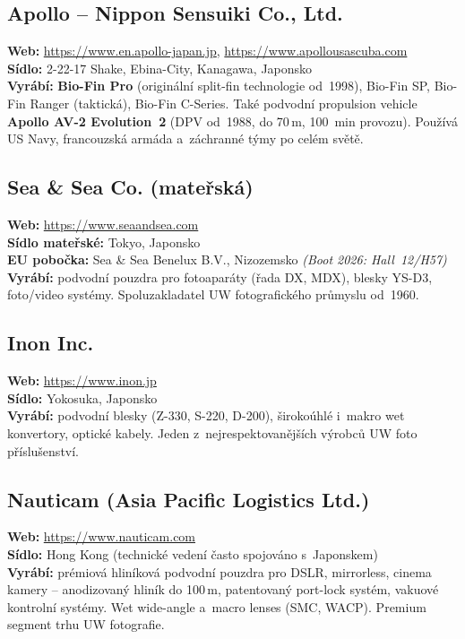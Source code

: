 \documentclass[11pt,a4paper]{article}
\begin{document}
\subsection{Apollo -- Nippon Sensuiki Co., Ltd.}
\textbf{Web:} \url{https://www.en.apollo-japan.jp}, \url{https://www.apollousascuba.com} \\
\textbf{Sídlo:} 2-22-17 Shake, Ebina-City, Kanagawa, Japonsko \\
\textbf{Vyrábí:} \textbf{Bio-Fin Pro} (originální split-fin technologie od~1998), Bio-Fin SP, Bio-Fin Ranger (taktická), Bio-Fin C-Series. Také podvodní propulsion vehicle \textbf{Apollo AV-2 Evolution~2} (DPV od~1988, do 70\,m, 100~min provozu). Používá US Navy, francouzská armáda a~záchranné týmy po celém světě.

\subsection{Sea \& Sea Co. (mateřská)}
\textbf{Web:} \url{https://www.seaandsea.com} \\
\textbf{Sídlo mateřské:} Tokyo, Japonsko \\
\textbf{EU pobočka:} Sea \& Sea Benelux B.V., Nizozemsko \quad\emph{(Boot 2026: Hall~12/H57)} \\
\textbf{Vyrábí:} podvodní pouzdra pro fotoaparáty (řada DX, MDX), blesky YS-D3, foto/video systémy. Spoluzakladatel UW fotografického průmyslu od~1960.

\subsection{Inon Inc.}
\textbf{Web:} \url{https://www.inon.jp} \\
\textbf{Sídlo:} Yokosuka, Japonsko \\
\textbf{Vyrábí:} podvodní blesky (Z-330, S-220, D-200), širokoúhlé i~makro wet konvertory, optické kabely. Jeden z~nejrespektovanějších výrobců UW foto příslušenství.

\subsection{Nauticam (Asia Pacific Logistics Ltd.)}
\textbf{Web:} \url{https://www.nauticam.com} \\
\textbf{Sídlo:} Hong Kong (technické vedení často spojováno s~Japonskem) \\
\textbf{Vyrábí:} prémiová hliníková podvodní pouzdra pro DSLR, mirrorless, cinema kamery -- anodizovaný hliník do 100\,m, patentovaný port-lock systém, vakuové kontrolní systémy. Wet wide-angle a~macro lenses (SMC, WACP). Premium segment trhu UW fotografie.
\end{document}
